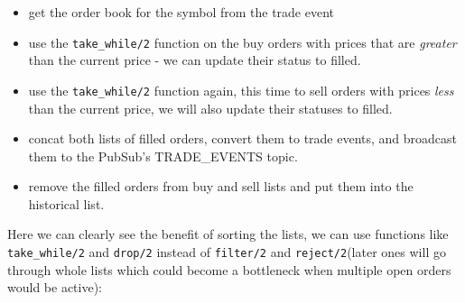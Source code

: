 \documentclass[
  oneside]{book}
\providecommand{\tightlist}{%
  \setlength{\itemsep}{0pt}\setlength{\parskip}{0pt}}
\begin{document}
\begin{itemize}
\tightlist
\item
  get the order book for the symbol from the trade event
\item
  use the \texttt{take\_while/2} function on the buy orders with prices that are \emph{greater} than the current price - we can update their status to filled.
\item
  use the \texttt{take\_while/2} function again, this time to sell orders with prices \emph{less} than the current price, we will also update their statuses to filled.
\item
  concat both lists of filled orders, convert them to trade events, and broadcast them to the PubSub's TRADE\_EVENTS topic.
\item
  remove the filled orders from buy and sell lists and put them into the historical list.
\end{itemize}

Here we can clearly see the benefit of sorting the lists, we can use functions like \texttt{take\_while/2} and \texttt{drop/2} instead of \texttt{filter/2}
and \texttt{reject/2}(later ones will go through whole lists which could become a bottleneck when multiple open orders would be active):
\end{document}
